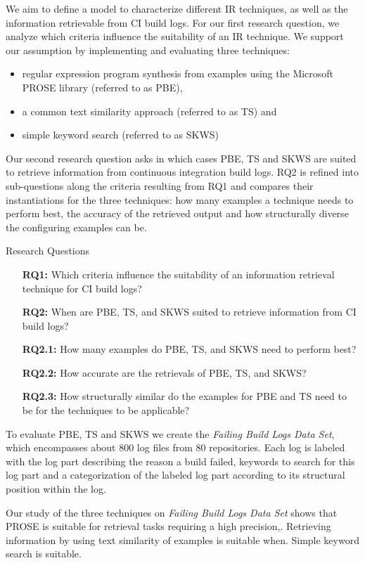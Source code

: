 \documentclass[\myrootdir/main.tex]{subfiles}
\begin{document}
We aim to define a model to characterize different IR techniques, as well as the information retrievable from CI build logs.
For our first research question, we analyze which criteria influence the suitability of an IR technique.
We support our assumption by implementing and evaluating three techniques:
\begin{itemize}
  \item regular expression program synthesis from examples using the Microsoft PROSE library (referred to as PBE),
  \item a common text similarity approach (referred to as TS) and
  \item simple keyword search (referred to as SKWS)
\end{itemize}
Our second research question asks in which cases PBE, TS and SKWS are suited to retrieve information from continuous integration build logs. RQ2 is refined into sub-questions along the criteria resulting from RQ1 and compares their instantiations for the three techniques: how many examples a technique needs to perform best, the accuracy of the retrieved output and how structurally diverse the configuring examples can be.
\begin{simplebox}{Research Questions}
\begin{itemize}
  \item[\textbf{RQ1:}] Which criteria influence the suitability of an information retrieval technique for CI build logs?
  \item[\textbf{RQ2:}] When are PBE, TS, and SKWS suited to retrieve information from CI build logs?
  \item[\textbf{RQ2.1:}] How many examples do PBE, TS, and SKWS need to perform best?
  \item[\textbf{RQ2.2:}] How accurate are the retrievals of PBE, TS, and SKWS?
  \item[\textbf{RQ2.3:}] How structurally similar do the examples for PBE and TS need to be for the techniques to be applicable?
\end{itemize}
\end{simplebox}
To evaluate PBE, TS and SKWS we create the \emph{Failing Build Logs Data Set}, which encompasses about 800 log files from 80 repositories. Each log is labeled with the log part describing the reason a build failed, keywords to search for this log part and a categorization of the labeled log part according to its structural position within the log. 



Our study of the three techniques on \emph{Failing Build Logs Data Set} shows that PROSE is suitable for retrieval tasks requiring a high precision,. Retrieving information by using text similarity of examples is suitable when. Simple keyword search is suitable.
\end{document}
